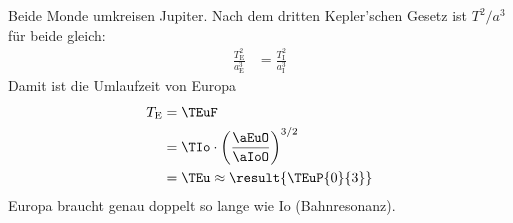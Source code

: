 Beide Monde umkreisen Jupiter. Nach dem dritten Kepler'schen Gesetz ist $T^2/a^3$ für beide gleich:
\begin{align}
 \frac{T_\text{E}^2}{a_\text{E}^3} &= \frac{T_\text{I}^2}{a_\text{I}^3}
\end{align}
Damit ist die Umlaufzeit von Europa
\begin{align}
 T_\text{E} &= \TEuF \\
   &= \TIo\cdot\left(\frac{\aEuO}{\aIoO}\right)^{3/2} \\
   &= \TEu \approx \result{\TEuP{0}{3}}
\end{align}
Europa braucht genau doppelt so lange wie Io (Bahnresonanz).
